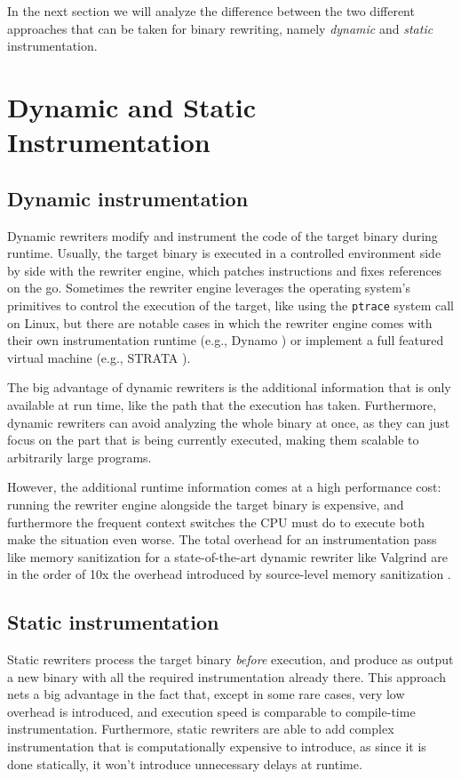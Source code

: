 \documentclass[a4paper,11pt,oneside]{report}
\begin{document}
In the next section we will analyze the difference between the two different 
approaches that can be taken for binary rewriting, namely \emph{dynamic} and 
\emph{static} instrumentation.




\section{Dynamic and Static Instrumentation}

\subsection{Dynamic instrumentation}
Dynamic rewriters modify and instrument the code of the target binary during 
runtime. Usually, the target binary is executed in a controlled environment 
side by side with the rewriter engine, which patches instructions and fixes 
references on the go. Sometimes the rewriter engine leverages the operating 
system's primitives to control the execution of the target, like using the 
\texttt{ptrace} system call on Linux, but there are notable cases in which the 
rewriter engine comes with their own instrumentation runtime (e.g., Dynamo 
\cite{dynamo}) or implement a full featured virtual machine (e.g., STRATA 
\cite{strata}).

The big advantage of dynamic rewriters is the additional information that is 
only available at run time, like the path that the execution has taken.  
Furthermore, dynamic rewriters can avoid analyzing the whole binary at once, as 
they can just focus on the part that is being currently executed, making them 
scalable to arbitrarily large programs.

However, the additional runtime information comes at a high performance cost: 
running the rewriter engine alongside the target binary is expensive, and 
furthermore the frequent context switches the CPU must do to execute both make 
the situation even worse. The total overhead for an instrumentation pass like 
memory sanitization for a state-of-the-art dynamic rewriter like Valgrind are 
in the order of 10x \cite{dinesh20oakland} the overhead introduced by 
source-level memory sanitization .

\subsection{Static instrumentation}
Static rewriters process the target binary \emph{before} execution, and produce 
as output a new binary with all the required instrumentation already there.  
This approach nets a big advantage in the fact that, except in some rare cases, 
very low overhead is introduced, and execution speed is comparable to 
compile-time instrumentation. Furthermore, static rewriters are able to add 
complex instrumentation that is computationally expensive to introduce, as 
since it is done statically, it won't introduce unnecessary delays at runtime.
\end{document}
